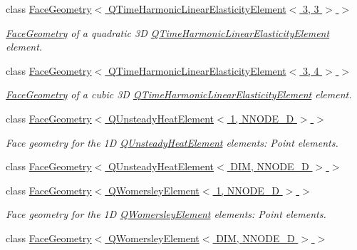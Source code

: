\begin{DoxyCompactItemize}
class \hyperlink{classoomph_1_1FaceGeometry_3_01QTimeHarmonicLinearElasticityElement_3_013_00_013_01_4_01_4}{Face\+Geometry$<$ Q\+Time\+Harmonic\+Linear\+Elasticity\+Element$<$ 3, 3 $>$ $>$}
\begin{DoxyCompactList}\small\item\em \hyperlink{classoomph_1_1FaceGeometry}{Face\+Geometry} of a quadratic 3D \hyperlink{classoomph_1_1QTimeHarmonicLinearElasticityElement}{Q\+Time\+Harmonic\+Linear\+Elasticity\+Element} element. \end{DoxyCompactList}\item 
class \hyperlink{classoomph_1_1FaceGeometry_3_01QTimeHarmonicLinearElasticityElement_3_013_00_014_01_4_01_4}{Face\+Geometry$<$ Q\+Time\+Harmonic\+Linear\+Elasticity\+Element$<$ 3, 4 $>$ $>$}
\begin{DoxyCompactList}\small\item\em \hyperlink{classoomph_1_1FaceGeometry}{Face\+Geometry} of a cubic 3D \hyperlink{classoomph_1_1QTimeHarmonicLinearElasticityElement}{Q\+Time\+Harmonic\+Linear\+Elasticity\+Element} element. \end{DoxyCompactList}\item 
class \hyperlink{classoomph_1_1FaceGeometry_3_01QUnsteadyHeatElement_3_011_00_01NNODE__1D_01_4_01_4}{Face\+Geometry$<$ Q\+Unsteady\+Heat\+Element$<$ 1, N\+N\+O\+D\+E\+\_\+D $>$ $>$}
\begin{DoxyCompactList}\small\item\em Face geometry for the 1D \hyperlink{classoomph_1_1QUnsteadyHeatElement}{Q\+Unsteady\+Heat\+Element} elements\+: Point elements. \end{DoxyCompactList}\item 
class \hyperlink{classoomph_1_1FaceGeometry_3_01QUnsteadyHeatElement_3_01DIM_00_01NNODE__1D_01_4_01_4}{Face\+Geometry$<$ Q\+Unsteady\+Heat\+Element$<$ D\+I\+M, N\+N\+O\+D\+E\+\_\+D $>$ $>$}
\item 
class \hyperlink{classoomph_1_1FaceGeometry_3_01QWomersleyElement_3_011_00_01NNODE__1D_01_4_01_4}{Face\+Geometry$<$ Q\+Womersley\+Element$<$ 1, N\+N\+O\+D\+E\+\_\+D $>$ $>$}
\begin{DoxyCompactList}\small\item\em Face geometry for the 1D \hyperlink{classoomph_1_1QWomersleyElement}{Q\+Womersley\+Element} elements\+: Point elements. \end{DoxyCompactList}\item 
class \hyperlink{classoomph_1_1FaceGeometry_3_01QWomersleyElement_3_01DIM_00_01NNODE__1D_01_4_01_4}{Face\+Geometry$<$ Q\+Womersley\+Element$<$ D\+I\+M, N\+N\+O\+D\+E\+\_\+D $>$ $>$}

\end{DoxyCompactItemize}
